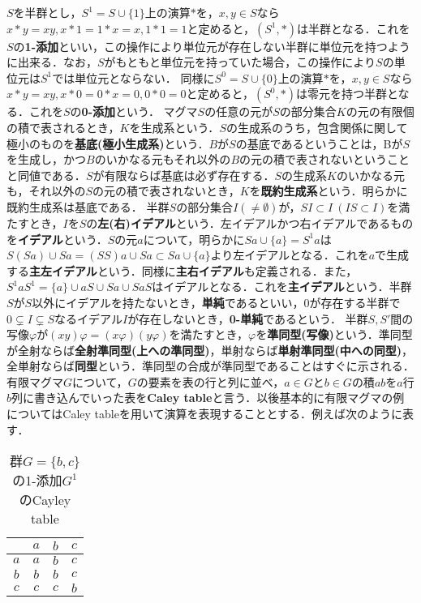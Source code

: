 $S$を半群とし，$S^1=S\cup\{1\}$上の演算$*$を，$x,y\in S$なら$x*y=xy, x*1=1*x=x, 1*1=1$と定めると，$(S^1,*)$は半群となる．これを$S$の{\bf 1-添加}といい，この操作により単位元が存在しない半群に単位元を持つように出来る．なお，$S$がもともと単位元を持っていた場合，この操作により$S$の単位元は$S^1$では単位元とならない．
同様に$S^0=S\cup\{0\}$上の演算$*$を，$x,y\in S$なら$x*y=xy, x*0=0*x=0, 0*0=0$と定めると，$(S^0,*)$は零元を持つ半群となる．これを$S$の{\bf 0-添加}という．
マグマ$S$の任意の元が$S$の部分集合$K$の元の有限個の積で表されるとき，$K$を生成系という．$S$の生成系のうち，包含関係に関して極小のものを{\bf 基底(極小生成系)}という．$B$が$S$の基底であるということは，Bが$S$を生成し，かつ$B$のいかなる元もそれ以外の$B$の元の積で表されないということと同値である．$S$が有限ならば基底は必ず存在する．$S$の生成系$K$のいかなる元も，それ以外の$S$の元の積で表されないとき，$K$を{\bf 既約生成系}という．明らかに既約生成系は基底である．
半群$S$の部分集合$I(\neq\emptyset)$が，$SI\subset I\:(IS\subset I)$を満たすとき，$I$を$S$の{\bf 左(右)イデアル}という．左イデアルかつ右イデアルであるものを{\bf イデアル}という．$S$の元$a$について，明らかに$Sa\cup\{a\}=S^1a$は$S(Sa)\cup Sa=(SS)a\cup Sa\subset Sa\cup\{a\}$より左イデアルとなる．これを$a$で生成する{\bf 主左イデアル}という．同様に{\bf 主右イデアル}も定義される．また，$S^1aS^1=\{a\}\cup aS\cup Sa\cup SaS$はイデアルとなる．これを{\bf 主イデアル}という．半群$S$が$S$以外にイデアルを持たないとき，{\bf 単純}であるといい，$0$が存在する半群で$0\subsetneq I\subsetneq S$なるイデアル$I$が存在しないとき，{\bf 0-単純}であるという．
半群$S,S'$間の写像$\varphi$が$(xy)\varphi=(x\varphi)(y\varphi)$を満たすとき，$\varphi$を{\bf 準同型(写像)}という．準同型が全射ならば{\bf 全射準同型(上への準同型)}，単射ならば{\bf 単射準同型(中への同型)}，全単射ならば{\bf 同型}という．準同型の合成が準同型であることはすぐに示される．
有限マグマ$G$について，$G$の要素を表の行と列に並べ，$a\in G$と$b\in G$の積$ab$を$a$行$b$列に書き込んでいった表を{\bf Caley table}と言う．以後基本的に有限マグマの例についてはCaley tableを用いて演算を表現することとする．例えば次のように表す．
\begin{table}[htb]
\begin{center}
\begin{tabular}{c|ccc}
 &$a$&$b$&$c$ \\ \hline
$a$&$a$&$b$&$c$ \\
$b$&$b$&$b$&$c$ \\
$c$&$c$&$c$&$b$    
\end{tabular}
\caption{群$G=\{b,c\}$の1-添加$G^1$のCayley table}
\end{center}
\end{table}
